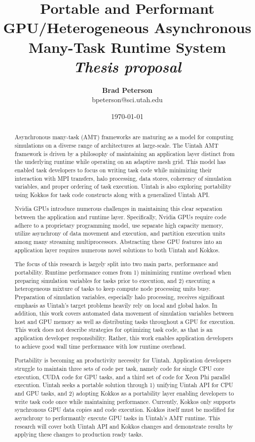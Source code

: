 \documentclass[12pt]{article}
\title{{\bf Portable and Performant GPU/Heterogeneous Asynchronous Many-Task Runtime System} \\
\it Thesis proposal}
\author{ {\bf Brad Peterson}  \\
{\small bpeterson@sci.utah.edu}
}
\date{\today}
\begin{document}
\pagestyle{plain}
\maketitle

\pagebreak
\begin{abstract}

Asynchronous many-task (AMT) frameworks are maturing as a model for computing simulations on a diverse range of architectures at large-scale.  The Uintah AMT framework is driven by a philosophy of maintaining an application layer distinct from the underlying runtime while operating on an adaptive mesh grid.  This model has enabled task developers to focus on writing task code while minimizing their interaction with MPI transfers, halo processing, data stores, coherency of simulation variables, and proper ordering of task execution.   Uintah is also exploring portability using Kokkos for task code constructs along with a generalized Uintah API.  

Nvidia GPUs introduce numerous challenges in maintaining this clear separation between the application and runtime layer.  Specifically, Nvidia GPUs require code adhere to a proprietary programming model, use separate high capacity memory, utilize asynchrony of data movement and execution, and partition execution units among many streaming multiprocessors.  Abstracting these GPU features into an application layer requires numerous novel solutions to both Uintah and Kokkos.  

The focus of this research is largely split into two main parts, performance and portability.  Runtime performance comes from 1) minimizing runtime overhead when preparing simulation variables for tasks prior to execution, and 2) executing a heterogeneous mixture of tasks to keep compute node processing units busy.  Preparation of simulation variables, especially halo processing, receives significant emphasis as Uintah's target problems heavily rely on local and global halos.  In addition, this work covers automated data movement of simulation variables between host and GPU memory as well as distributing tasks throughout a GPU for execution.   This work does not describe strategies for optimizing task code, as that is an application developer responsibility.  Rather, this work enables application developers to achieve good wall time performance with low runtime overhead.   

Portability is becoming an productivity necessity for Uintah.  Application developers struggle to maintain three sets of code per task, namely code for single CPU core execution, CUDA code for GPU tasks, and a third set of code for Xeon Phi parallel execution.  Uintah seeks a portable solution through 1) unifying Uintah API for CPU and GPU tasks, and 2) adopting Kokkos as a portability layer enabling developers to write task code once while maintaining performance. Currently, Kokkos only supports synchronous GPU data copies and code execution.  Kokkos itself must be modified for asynchrony to performantly execute GPU tasks in Uintah's AMT runtime.  This research will cover both Uintah API and Kokkos changes and demonstrate results by applying these changes to production ready tasks.  
   

\end{abstract}
\end{document}

